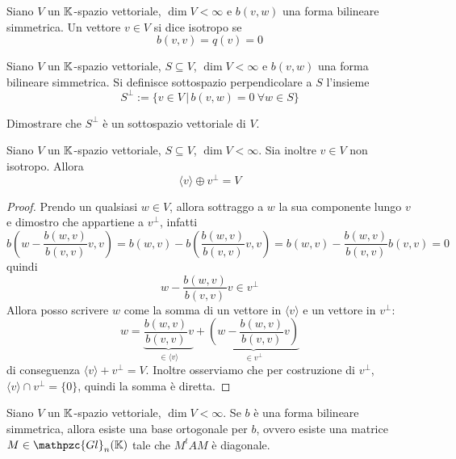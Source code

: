 \documentclass{article}     %
\newcommand{\gln}[2]{\mathpzc{Gl}_{#1}(#2)}
\begin{document}
\begin{boxdef}
    Siano $V$ un $\mathbb{K}$-spazio vettoriale, $\dim V<\infty$ e $b(v,w)$ una forma bilineare simmetrica. Un vettore $v\in V$ si dice isotropo se 
    \[b(v,v)=q(v)=0\]
\end{boxdef}

\begin{boxdef}
    Siano $V$ un $\mathbb{K}$-spazio vettoriale, $S\subseteq V$, $\dim V<\infty$ e $b(v,w)$ una forma bilineare simmetrica. Si definisce sottospazio perpendicolare a $S$ l'insieme 
    \[S^\perp:=\{v\in V\,|\,b(v,w)=0\ \forall w \in S\}\]
\end{boxdef}
\begin{exc}\label{exc: sottosp perp}
    Dimostrare che $S^\perp$ è un sottospazio vettoriale di $V$.
\end{exc}
\begin{lemma}
    Siano $V$ un $\mathbb{K}$-spazio vettoriale, $S\subseteq V$, $\dim V<\infty$. Sia inoltre $v\in V$ non isotropo. Allora \[\langle v \rangle \oplus v^\perp = V\]
\end{lemma}
\begin{proof}
    Prendo un qualsiasi $w\in V$, allora sottraggo a $w$ la sua componente lungo $v$ e dimostro che appartiene a $v^\perp$, infatti 
    \[b\left( w-\frac{b(w,v)}{b(v,v)}v,v \right)= b(w,v)-b\left(\frac{b(w,v)}{b(v,v)}v,v\right)= b(w,v)-\frac{b(w,v)}{b(v,v)}b(v,v)=0\]
    quindi 
    \[ w-\frac{b(w,v)}{b(v,v)}v\in v^\perp\]
    Allora posso scrivere $w$ come la somma di un vettore in $\langle v\rangle$ e un vettore in $v^\perp$:
    \[w=\underbrace{\frac{b(w,v)}{b(v,v)}v}_{\in\langle v\rangle}+\underbrace{\left( w-\frac{b(w,v)}{b(v,v)}v \right)}_{\in v^\perp}\]
    di conseguenza \(\langle v \rangle + v^\perp = V\). Inoltre osserviamo che per costruzione di $v^\perp$, \(\langle v \rangle \cap v^\perp = \{0\}\), quindi la somma è diretta.
\end{proof}

\begin{shadedTheorem}
    Siano $V$ un $\mathbb{K}$-spazio vettoriale, $\dim V<\infty$. Se $b$ è una forma bilineare simmetrica, allora esiste una base ortogonale per $b$, ovvero esiste una matrice $M\in \gln{n}{\K}$ tale che $M^tAM$ è diagonale.
\end{shadedTheorem}
\end{document}
